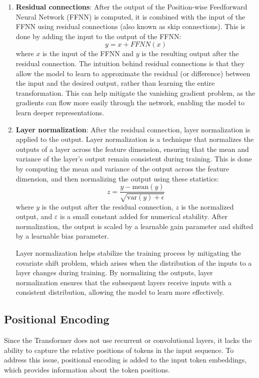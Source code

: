 \documentclass[12pt]{article}
\begin{document}
\begin{enumerate}
	\item {\textbf{Residual connections}: After the output of the Position-wise Feedforward Neural Network (FFNN) is computed, it is combined with the input of the FFNN using residual connections (also known as skip connections). This is done by adding the input to the output of the FFNN:
	$$y = x + FFNN(x) $$
	where $x$ is the input of the FFNN and $y$ is the resulting output after the residual connection. The intuition behind residual connections is that they allow the model to learn to approximate the residual (or difference) between the input and the desired output, rather than learning the entire transformation. This can help mitigate the vanishing gradient problem, as the gradients can flow more easily through the network, enabling the model to learn deeper representations.
	}
	\item {\textbf{Layer normalization}: After the residual connection, layer normalization is applied to the output. Layer normalization is a technique that normalizes the outputs of a layer across the feature dimension, ensuring that the mean and variance of the layer's output remain consistent during training. This is done by computing the mean and variance of the output across the feature dimension, and then normalizing the output using these statistics:
$$z = \frac{y - \text{mean}(y)}{\sqrt{\text{var}(y) + \epsilon}}$$
where $y$ is the output after the residual connection, $z$ is the normalized output, and $\varepsilon$ is a small constant added for numerical stability. After normalization, the output is scaled by a learnable gain parameter and shifted by a learnable bias parameter.

Layer normalization helps stabilize the training process by mitigating the covariate shift problem, which arises when the distribution of the inputs to a layer changes during training. By normalizing the outputs, layer normalization ensures that the subsequent layers receive inputs with a consistent distribution, allowing the model to learn more effectively.}
\end{enumerate}

\subsection{Positional Encoding}

Since the Transformer does not use recurrent or convolutional layers, it lacks the ability to capture the relative positions of tokens in the input sequence. To address this issue, positional encoding is added to the input token embeddings, which provides information about the token positions.
\end{document}
